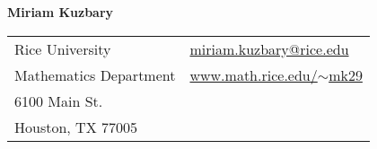 \documentclass[letterpaper,11pt,oneside]{article}
\begin{document}

\noindent  \LARGE{\textbf{Miriam Kuzbary}}  \\
\vspace{-2ex}
\normalsize


\begin{center}
\begin{tabular}{l l}
Rice University    & \hspace{1in} \href{mailto:miriam.kuzbary@rice.edu}{miriam.kuzbary@rice.edu} \\
Mathematics Department    & \hspace{1in}  \href{www.math.rice.edu/~mk29}{www.math.rice.edu/$\sim$mk29}   \\
6100 Main St.           &  \\
Houston, TX 77005 & \hspace{1in}  \\
\end{tabular}
\end{center}

\vspace{1em}

\end{document}
